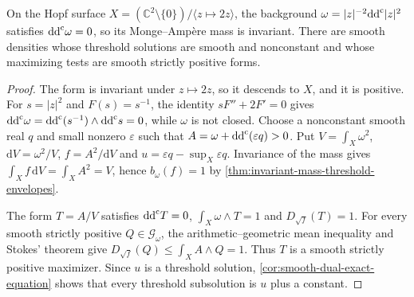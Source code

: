 \begin{example}\label{ex:hopf-surface-invariant-attainment}
On the Hopf surface $X=(\mathbb C^2\setminus\{0\})/\langle z\mapsto2z\rangle$, the background $\omega=|z|^{-2}\mathrm{dd}^{\mathrm{c}}|z|^2$ satisfies $\mathrm{dd}^{\mathrm{c}}\omega=0$, so its Monge--Amp\`ere mass is invariant. There are smooth densities whose threshold solutions are smooth and nonconstant and whose maximizing tests are smooth strictly positive forms.
\end{example}
\begin{proof}
The form is invariant under $z\mapsto2z$, so it descends to $X$, and it is positive. For $s=|z|^2$ and $F(s)=s^{-1}$, the identity $sF''+2F'=0$ gives $\mathrm{dd}^{\mathrm{c}}\omega=\mathrm{dd}^{\mathrm{c}}(s^{-1})\wedge\mathrm{dd}^{\mathrm{c}} s=0$, while $\omega$ is not closed. Choose a nonconstant smooth real $q$ and small nonzero $\varepsilon$ such that $A=\omega+\mathrm{dd}^{\mathrm{c}}(\varepsilon q)>0$. Put $V=\int_X\omega^2$, $\mathrm{d}V=\omega^2/V$, $f=A^2/\mathrm{d}V$ and $u=\varepsilon q-\sup_X\varepsilon q$. Invariance of the mass gives $\int_Xf\,\mathrm{d}V=\int_XA^2=V$, hence $b_\omega(f)=1$ by \cref{thm:invariant-mass-threshold-envelopes}.

The form $T=A/V$ satisfies $\mathrm{dd}^{\mathrm{c}} T=0$, $\int_X\omega\wedge T=1$ and $D_{\sqrt f}(T)=1$. For every smooth strictly positive $Q\in\mathscr G_\omega$, the arithmetic--geometric mean inequality and Stokes' theorem give $D_{\sqrt f}(Q)\leq\int_XA\wedge Q=1$. Thus $T$ is a smooth strictly positive maximizer. Since $u$ is a threshold solution, \cref{cor:smooth-dual-exact-equation} shows that every threshold subsolution is $u$ plus a constant.
\end{proof}

